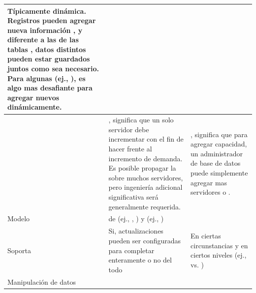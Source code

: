 \begin{table}[h!]
\begin{tabular}{ |L{0.1\paperwidth}|L{0.3\paperwidth}|L{0.3\paperwidth}|}
	Típicamente dinámica. Registros pueden agregar nueva información \onTheFly, y diferente a las \rowsDB de las tablas \sql, datos distintos pueden estar guardados juntos como sea necesario. Para algunas \dataBases (ej., \wideColumn \stores), es algo mas desafiante para agregar nuevos \fields dinámicamente.

\\ \hline
	\scaling&%
	
	\verticallyScale, significa que un solo servidor debe incrementar \powerful con el fin de hacer frente al incremento de demanda. Es posible propagar la \dataBase \sql sobre muchos servidores, pero ingeniería adicional significativa será generalmente requerida.&
	
	\horizontallyScale, significa que para agregar capacidad, un administrador de base de datos puede simplemente agregar mas servidores o \cloudInstances.
	
\\ \hline
	Modelo \development&
	
	\mix de \openSourcePC (ej., \postgresql, \mysql) y \closedSource (ej., \oracle \dataBase)&
	\openSourcePC
	
\\ \hline
	Soporta \transactionsDB&
	
	Si, actualizaciones pueden ser configuradas para completar enteramente o no del todo&	
	
	En ciertas circunstancias y en ciertos niveles (ej., \documentLevel vs. \dataBaseLevel)
	
\\ \hline
	Manipulación de datos&
	

\end{tabular}
\end{table}
